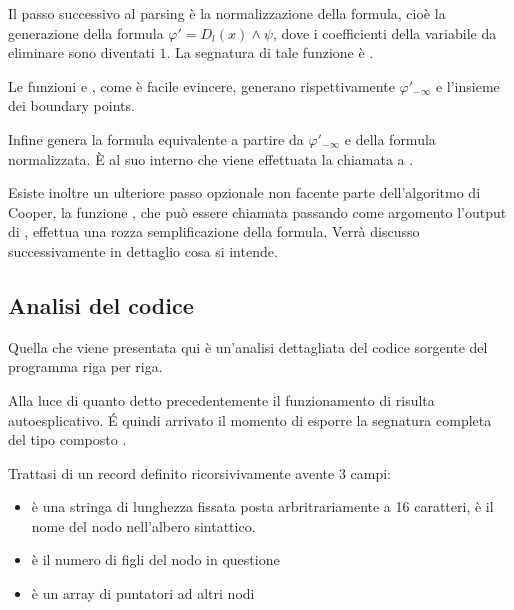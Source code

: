 \documentclass[11pt,letterpaper,twoside]{article}
\begin{document}
Il passo successivo al parsing è la normalizzazione della formula, cioè la generazione
della formula $\varphi' = D_l(x) \land \psi$, dove i coefficienti della variabile
da eliminare sono diventati $1$. La segnatura di tale funzione è .

Le funzioni  e \newline
{}, come è
facile evincere, generano rispettivamente $\varphi' _{- \infty}$ e l'insieme dei
boundary points.

Infine  genera la formula equivalente a partire da
$\varphi '_{- \infty}$ e della formula normalizzata. \`E al suo interno che viene
effettuata la chiamata a .

Esiste inoltre un ulteriore passo opzionale non facente parte dell'algoritmo di
Cooper, la funzione , che può essere
chiamata passando come argomento l'output di , effettua una
rozza semplificazione della formula. Verrà discusso successivamente in dettaglio
cosa si intende. 

\subsection{Analisi del codice}
Quella che viene presentata qui è un'analisi dettagliata del codice sorgente del
programma riga per riga.


Alla luce di quanto detto precedentemente il funzionamento di 
risulta autoesplicativo. \'E quindi arrivato il momento di esporre la segnatura
completa del tipo composto .


Trattasi di un record definito ricorsivivamente avente $3$ campi:

\begin{itemize}
  \item {} è una stringa di lunghezza fissata posta
    arbritrariamente a 16 caratteri, è il nome del nodo nell'albero sintattico.
  \item {} è il numero di figli del nodo in questione
  \item {} è un array di puntatori ad altri nodi
\end{itemize}
\end{document}
